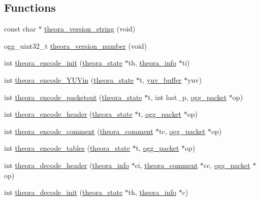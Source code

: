 \subsection*{Functions}
\begin{DoxyCompactItemize}
\item 
const char $\ast$ \hyperlink{group__oldfuncs_ga5a3da8fd262a60f055f96536eec06df2}{theora\+\_\+version\+\_\+string} (void)
\item 
ogg\+\_\+uint32\+\_\+t \hyperlink{group__oldfuncs_gad181f4b19d455dcc2bef2533530b84c8}{theora\+\_\+version\+\_\+number} (void)
\item 
int \hyperlink{group__oldfuncs_ga0f7ad4d4b2343278cb4ba8fb2bd5109a}{theora\+\_\+encode\+\_\+init} (\hyperlink{structtheora__state}{theora\+\_\+state} $\ast$th, \hyperlink{structtheora__info}{theora\+\_\+info} $\ast$ti)
\item 
int \hyperlink{group__oldfuncs_gac0d33d896ca70cedfc94c5986d947078}{theora\+\_\+encode\+\_\+\+Y\+U\+Vin} (\hyperlink{structtheora__state}{theora\+\_\+state} $\ast$t, \hyperlink{structyuv__buffer}{yuv\+\_\+buffer} $\ast$yuv)
\item 
int \hyperlink{group__oldfuncs_ga5f4929677a735bc2198c2309d235f1b3}{theora\+\_\+encode\+\_\+packetout} (\hyperlink{structtheora__state}{theora\+\_\+state} $\ast$t, int last\+\_\+p, \hyperlink{structogg__packet}{ogg\+\_\+packet} $\ast$op)
\item 
int \hyperlink{group__oldfuncs_ga451feb58d6bde726edbae193689887be}{theora\+\_\+encode\+\_\+header} (\hyperlink{structtheora__state}{theora\+\_\+state} $\ast$t, \hyperlink{structogg__packet}{ogg\+\_\+packet} $\ast$op)
\item 
int \hyperlink{group__oldfuncs_ga45e8db0713eaaca0f1144f3724cb834a}{theora\+\_\+encode\+\_\+comment} (\hyperlink{structtheora__comment}{theora\+\_\+comment} $\ast$tc, \hyperlink{structogg__packet}{ogg\+\_\+packet} $\ast$op)
\item 
int \hyperlink{group__oldfuncs_ga5085baf20855b283fa01fc948505d9d2}{theora\+\_\+encode\+\_\+tables} (\hyperlink{structtheora__state}{theora\+\_\+state} $\ast$t, \hyperlink{structogg__packet}{ogg\+\_\+packet} $\ast$op)
\item 
int \hyperlink{group__oldfuncs_ga02915e63c1bd733ee291f577a8b75a82}{theora\+\_\+decode\+\_\+header} (\hyperlink{structtheora__info}{theora\+\_\+info} $\ast$ci, \hyperlink{structtheora__comment}{theora\+\_\+comment} $\ast$cc, \hyperlink{structogg__packet}{ogg\+\_\+packet} $\ast$op)
\item 
int \hyperlink{group__oldfuncs_ga264907c66003799ff77ecbd09eb33d2c}{theora\+\_\+decode\+\_\+init} (\hyperlink{structtheora__state}{theora\+\_\+state} $\ast$th, \hyperlink{structtheora__info}{theora\+\_\+info} $\ast$c)

\end{DoxyCompactItemize}
